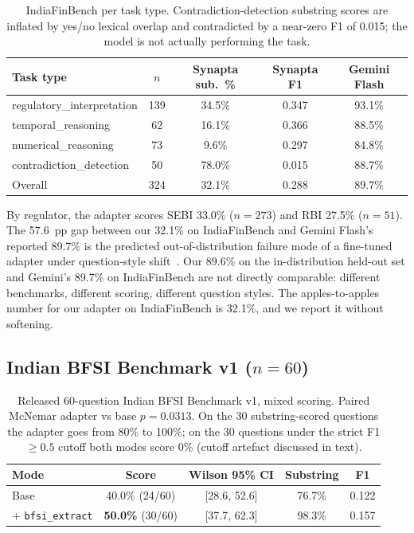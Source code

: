 \documentclass{article}
\begin{document}
\begin{table}[h]
  \caption{IndiaFinBench per task type. Contradiction-detection substring scores are inflated by yes/no lexical overlap and contradicted by a near-zero F1 of 0.015; the model is not actually performing the task.}
  \label{tab:indiafin-tasks}
  \centering
  \begin{tabular}{lcccc}
    \toprule
    Task type & $n$ & Synapta sub.\ \% & Synapta F1 & Gemini Flash \\
    \midrule
    regulatory\_interpretation & 139 & 34.5\% & 0.347 & 93.1\% \\
    temporal\_reasoning        &  62 & 16.1\% & 0.366 & 88.5\% \\
    numerical\_reasoning       &  73 &  9.6\% & 0.297 & 84.8\% \\
    contradiction\_detection   &  50 & 78.0\% & 0.015 & 88.7\% \\
    \midrule
    Overall                    & 324 & 32.1\% & 0.288 & 89.7\% \\
    \bottomrule
  \end{tabular}
\end{table}

By regulator, the adapter scores SEBI 33.0\% ($n{=}273$) and RBI 27.5\% ($n{=}51$). The 57.6~pp gap between our 32.1\% on IndiaFinBench and Gemini Flash's reported 89.7\% is the predicted out-of-distribution failure mode of a fine-tuned adapter under question-style shift~\citep{liang2022helm}. Our 89.6\% on the in-distribution held-out set and Gemini's 89.7\% on IndiaFinBench are not directly comparable: different benchmarks, different scoring, different question styles. The apples-to-apples number for our adapter on IndiaFinBench is 32.1\%, and we report it without softening.

\subsection{Indian BFSI Benchmark v1 ($n{=}60$)}

\begin{table}[h]
  \caption{Released 60-question Indian BFSI Benchmark v1, mixed scoring. Paired McNemar adapter vs base $p{=}0.0313$. On the 30 substring-scored questions the adapter goes from 80\% to 100\%; on the 30 questions under the strict F1$\geq0.5$ cutoff both modes score 0\% (cutoff artefact discussed in text).}
  \label{tab:benchmark}
  \centering
  \begin{tabular}{lcccc}
    \toprule
    Mode & Score & Wilson 95\% CI & Substring & F1 \\
    \midrule
    Base & 40.0\% (24/60) & [28.6, 52.6] & 76.7\% & 0.122 \\
    + \texttt{bfsi\_extract} & \textbf{50.0\%} (30/60) & [37.7, 62.3] & 98.3\% & 0.157 \\
    \bottomrule
  \end{tabular}
\end{table}
\end{document}
